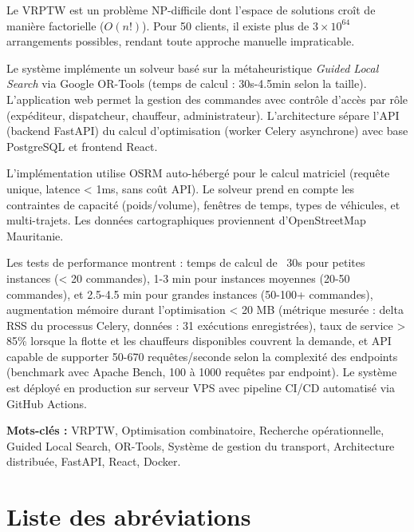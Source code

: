 \documentclass[12pt,a4paper]{report}
\begin{document}
Le VRPTW est un problème NP-difficile dont l'espace de solutions croît de manière factorielle ($O(n!)$). Pour 50 clients, il existe plus de $3 \times 10^{64}$ arrangements possibles, rendant toute approche manuelle impraticable.

Le système implémente un solveur basé sur la métaheuristique \textit{Guided Local Search} via Google OR-Tools (temps de calcul : 30s-4.5min selon la taille). L'application web permet la gestion des commandes avec contrôle d'accès par rôle (expéditeur, dispatcheur, chauffeur, administrateur). L'architecture sépare l'API (backend FastAPI) du calcul d'optimisation (worker Celery asynchrone) avec base PostgreSQL et frontend React.

L'implémentation utilise OSRM auto-hébergé pour le calcul matriciel (requête unique, latence < 1ms, sans coût API). Le solveur prend en compte les contraintes de capacité (poids/volume), fenêtres de temps, types de véhicules, et multi-trajets. Les données cartographiques proviennent d'OpenStreetMap Mauritanie.

Les tests de performance montrent : temps de calcul de ~30s pour petites instances (< 20 commandes), 1-3 min pour instances moyennes (20-50 commandes), et 2.5-4.5 min pour grandes instances (50-100+ commandes), augmentation mémoire durant l'optimisation < 20 MB (métrique mesurée : delta RSS du processus Celery, données : 31 exécutions enregistrées), taux de service > 85\% lorsque la flotte et les chauffeurs disponibles couvrent la demande, et API capable de supporter 50-670 requêtes/seconde selon la complexité des endpoints (benchmark avec Apache Bench, 100 à 1000 requêtes par endpoint). Le système est déployé en production sur serveur VPS avec pipeline CI/CD automatisé via GitHub Actions.

\textbf{Mots-clés :} VRPTW, Optimisation combinatoire, Recherche opérationnelle, Guided Local Search, OR-Tools, Système de gestion du transport, Architecture distribuée, FastAPI, React, Docker.

\vspace{1cm}


\tableofcontents
\clearpage

{}
\listoffigures
\clearpage

{}
\listoftables
\clearpage

\chapter*{Liste des abréviations}
\end{document}
